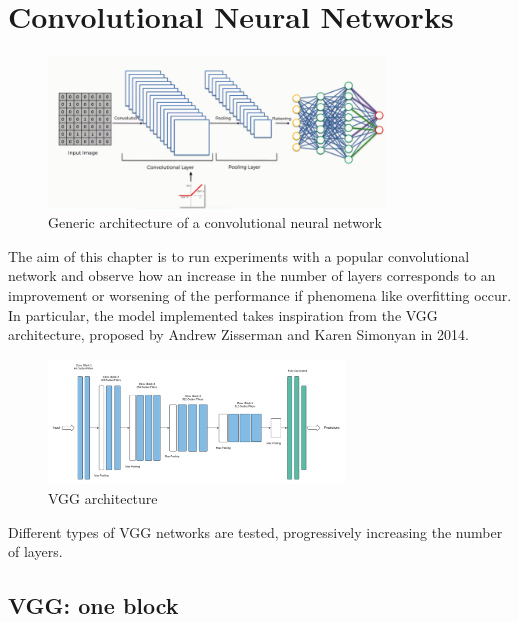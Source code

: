 \documentclass[10pt,english, openany]{book}
\begin{document}
\chapter{Convolutional Neural Networks}\label{chapt:modelCNN}
\begin{figure}[H]
    \centering
    \includegraphics[width=0.8\textwidth]{Images/CNN.png}
    \caption{Generic architecture of a convolutional neural network}
\end{figure}

The aim of this chapter is to run experiments with a popular convolutional network and observe how an increase in the number of layers corresponds to an improvement or worsening of the performance if phenomena like overfitting occur.
In particular, the model implemented takes inspiration from the VGG architecture, proposed by Andrew Zisserman and Karen Simonyan in 2014.

\begin{figure}[H]
    \centering
    \includegraphics[width=0.7\textwidth]{Images/2.0. VGG model.png}
    \caption{VGG architecture}
\end{figure}

Different types of VGG networks are tested, progressively increasing the number of layers.

\section{VGG: one block}
\end{document}
